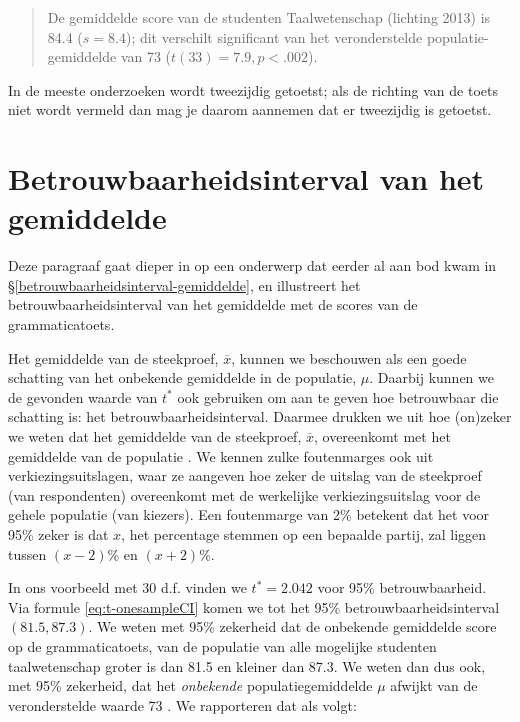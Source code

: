 \documentclass[
]{book}
\begin{document}
\begin{quote}
De gemiddelde score van de studenten Taalwetenschap (lichting 2013) is
84.4 (\(s=8.4\)); dit verschilt significant van het veronderstelde
populatie-gemiddelde van 73 (\(t(33)=7.9, p<.002\)).
\end{quote}

In de meeste onderzoeken wordt tweezijdig getoetst; als de richting van
de toets niet wordt vermeld dan mag je daarom aannemen dat er tweezijdig
is getoetst.

\hypertarget{sec:t-betrouwbaarheidsinterval-gemiddelde}{%
\section{Betrouwbaarheidsinterval van het gemiddelde}\label{sec:t-betrouwbaarheidsinterval-gemiddelde}}

Deze paragraaf gaat dieper in op een onderwerp dat eerder al aan bod kwam in §\ref{betrouwbaarheidsinterval-gemiddelde}, en illustreert het betrouwbaarheidsinterval van het gemiddelde met de scores van de grammaticatoets.

Het gemiddelde van de steekproef, \(\overline{x}\), kunnen we beschouwen
als een goede schatting van het onbekende gemiddelde in de populatie,
\(\mu\). Daarbij kunnen we de gevonden waarde van \(t^*\) ook gebruiken om
aan te geven hoe betrouwbaar die schatting is: het
betrouwbaarheidsinterval. Daarmee drukken we uit hoe (on)zeker we weten
dat het gemiddelde van de steekproef, \(\overline{x}\), overeenkomt met
het gemiddelde van de populatie \citep{Cumm12}. We kennen zulke foutenmarges
ook uit verkiezingsuitslagen, waar ze aangeven hoe zeker de uitslag van
de steekproef (van respondenten) overeenkomt met de werkelijke
verkiezingsuitslag voor de gehele populatie (van kiezers). Een
foutenmarge van 2\% betekent dat het voor 95\% zeker is dat \(x\), het
percentage stemmen op een bepaalde partij, zal liggen tussen \((x-2)\)\% en
\((x+2)\)\%.

In ons voorbeeld met 30 d.f. vinden we \(t^*=2.042\) voor 95\%
betrouwbaarheid. Via formule
\eqref{eq:t-onesampleCI} komen we tot het 95\%
betrouwbaarheidsinterval \((81.5, 87.3)\). We weten met 95\% zekerheid dat
de onbekende gemiddelde score op de grammaticatoets, van de populatie
van alle mogelijke studenten taalwetenschap groter is dan 81.5 en
kleiner dan 87.3. We weten dan dus ook, met 95\% zekerheid, dat het
\emph{onbekende} populatiegemiddelde \(\mu\) afwijkt van de veronderstelde
waarde 73 \citep{Cumm12}. We rapporteren dat als volgt:
\end{document}
